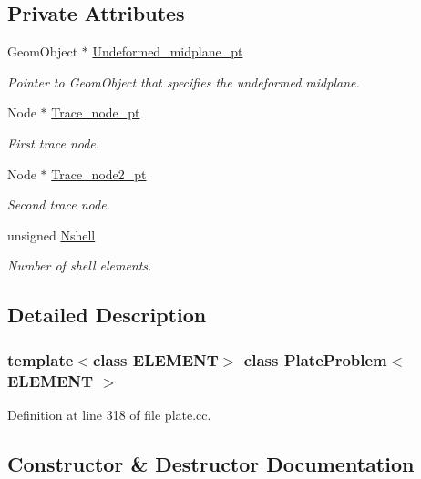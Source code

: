 \subsection*{Private Attributes}
\begin{DoxyCompactItemize}
\item 
Geom\+Object $\ast$ \hyperlink{classPlateProblem_aca229d8f14f7cf1fe21fe936db72dbc2}{Undeformed\+\_\+midplane\+\_\+pt}
\begin{DoxyCompactList}\small\item\em Pointer to Geom\+Object that specifies the undeformed midplane. \end{DoxyCompactList}\item 
Node $\ast$ \hyperlink{classPlateProblem_a376d88f920e7bd37f22c7835bae5d837}{Trace\+\_\+node\+\_\+pt}
\begin{DoxyCompactList}\small\item\em First trace node. \end{DoxyCompactList}\item 
Node $\ast$ \hyperlink{classPlateProblem_afdefc2caa57f4c3fe62c05a04fe330c1}{Trace\+\_\+node2\+\_\+pt}
\begin{DoxyCompactList}\small\item\em Second trace node. \end{DoxyCompactList}\item 
unsigned \hyperlink{classPlateProblem_a6e6ae2cacb761fd29c738e7ffe54a2d0}{Nshell}
\begin{DoxyCompactList}\small\item\em Number of shell elements. \end{DoxyCompactList}\end{DoxyCompactItemize}


\subsection{Detailed Description}
\subsubsection*{template$<$class E\+L\+E\+M\+E\+NT$>$\newline
class Plate\+Problem$<$ E\+L\+E\+M\+E\+N\+T $>$}



Definition at line 318 of file plate.\+cc.



\subsection{Constructor \& Destructor Documentation}
\mbox{\label{classPlateProblem_a0430a872a8929fcda9bb205d0e69fabb}} 
